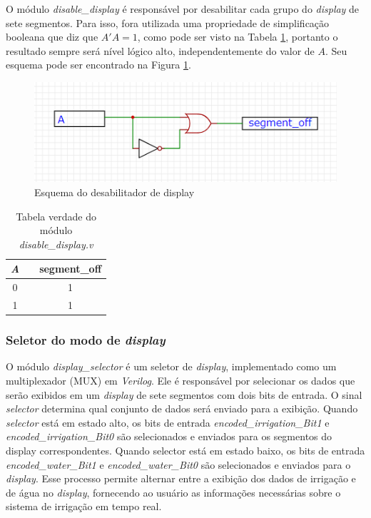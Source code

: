 \documentclass[
	article,			%
	11pt,				%
	oneside,			%
	a4paper,			%
	english,			%
	brazil,				%
	sumario=tradicional
	]{abntex2}
\begin{document}
O módulo \textit{disable\_display} é responsável por desabilitar cada grupo do \textit{display} de sete segmentos. Para isso, fora utilizada uma propriedade de simplificação booleana que diz que $A'A = 1$, como pode ser visto na Tabela \ref{tab:disable-display}, portanto o resultado sempre será nível lógico alto, independentemente do valor de $A$. Seu esquema pode ser encontrado na Figura \ref{fig:dis-display}.

\begin{figure}[H]
    \centering
    \includegraphics[width=0.75\linewidth]{disabledisplay.png}
    \caption{Esquema do desabilitador de display}
    \label{fig:dis-display}
\end{figure}


\begin{table}[H]
\centering
\begin{tabular}{|c|c|c|}
\hline
\textit{A} &  & segment\_off \\ \hline
0          &  & 1            \\ \hline
1          &  & 1            \\ \hline
\end{tabular}
\caption{Tabela verdade do módulo \textit{disable\_display.v}}
\label{tab:disable-display}
\end{table}

\subsubsection{Seletor do modo de \textit{display}}
O módulo \textit{display\_selector} é um seletor de \textit{display}, implementado como um multiplexador (MUX) em \textit{Verilog}. Ele é responsável por selecionar os dados que serão exibidos em um \textit{display} de sete segmentos com dois bits de entrada. O sinal \textit{selector} determina qual conjunto de dados será enviado para a exibição. Quando \textit{selector} está em estado alto, os bits de entrada \textit{encoded\_irrigation\_Bit1} e \textit{encoded\_irrigation\_Bit0} são selecionados e enviados para os segmentos do display correspondentes. Quando selector está em estado baixo, os bits de entrada \textit{encoded\_water\_Bit1} e \textit{encoded\_water\_Bit0} são selecionados e enviados para o \textit{display}. Esse processo permite alternar entre a exibição dos dados de irrigação e de água no \textit{display}, fornecendo ao usuário as informações necessárias sobre o sistema de irrigação em tempo real.
\end{document}
